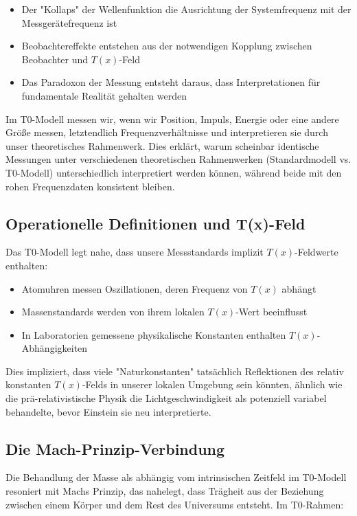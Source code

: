 \documentclass[12pt,a4paper]{article}
\newcommand{\Tfield}{T(x)}
\begin{document}
	\begin{itemize}
		\item Der "Kollaps" der Wellenfunktion die Ausrichtung der Systemfrequenz mit der Messgerätefrequenz ist
		\item Beobachtereffekte entstehen aus der notwendigen Kopplung zwischen Beobachter und $\Tfield$-Feld
		\item Das Paradoxon der Messung entsteht daraus, dass Interpretationen für fundamentale Realität gehalten werden
	\end{itemize}
	
	Im T0-Modell messen wir, wenn wir Position, Impuls, Energie oder eine andere Größe messen, letztendlich Frequenzverhältnisse und interpretieren sie durch unser theoretisches Rahmenwerk. Dies erklärt, warum scheinbar identische Messungen unter verschiedenen theoretischen Rahmenwerken (Standardmodell vs. T0-Modell) unterschiedlich interpretiert werden können, während beide mit den rohen Frequenzdaten konsistent bleiben.
	
	\subsection{Operationelle Definitionen und T(x)-Feld}
	
	Das T0-Modell legt nahe, dass unsere Messstandards implizit $\Tfield$-Feldwerte enthalten:
	
	\begin{itemize}
		\item Atomuhren messen Oszillationen, deren Frequenz von $\Tfield$ abhängt
		\item Massenstandards werden von ihrem lokalen $\Tfield$-Wert beeinflusst
		\item In Laboratorien gemessene physikalische Konstanten enthalten $\Tfield$-Abhängigkeiten
	\end{itemize}
	
	Dies impliziert, dass viele "Naturkonstanten" tatsächlich Reflektionen des relativ konstanten $\Tfield$-Felds in unserer lokalen Umgebung sein könnten, ähnlich wie die prä-relativistische Physik die Lichtgeschwindigkeit als potenziell variabel behandelte, bevor Einstein sie neu interpretierte.
	
	\subsection{Die Mach-Prinzip-Verbindung}
	
	Die Behandlung der Masse als abhängig vom intrinsischen Zeitfeld im T0-Modell resoniert mit Machs Prinzip, das nahelegt, dass Trägheit aus der Beziehung zwischen einem Körper und dem Rest des Universums entsteht. Im T0-Rahmen:
	
\end{document}
